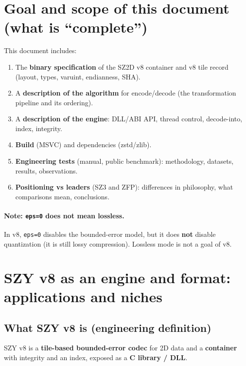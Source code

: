 \documentclass[11pt,a4paper]{article}
\begin{document}
\section{Goal and scope of this document (what is ``complete'')}
This document includes:
\begin{enumerate}
  \item The \textbf{binary specification} of the SZ2D v8 container and v8 tile record (layout, types, varuint, endianness, SHA).
  \item A \textbf{description of the algorithm} for encode/decode (the transformation pipeline and its ordering).
  \item A \textbf{description of the engine}: DLL/ABI API, thread control, decode-into, index, integrity.
  \item \textbf{Build} (MSVC) and dependencies (zstd/zlib).
  \item \textbf{Engineering tests} (manual, public benchmark): methodology, datasets, results, observations.
  \item \textbf{Positioning vs leaders} (SZ3 and ZFP): differences in philosophy, what comparisons mean, conclusions.
\end{enumerate}

\paragraph{Note: \texttt{eps=0} does not mean lossless.}
In v8, \texttt{eps=0} disables the bounded-error model, but it does \textbf{not} disable quantization (it is still lossy compression). Lossless mode is not a goal of v8.

\section{SZY v8 as an engine and format: applications and niches}

\subsection{What SZY v8 is (engineering definition)}
SZY v8 is a \textbf{tile-based bounded-error codec} for 2D data and a \textbf{container} with integrity and an index, exposed as a \textbf{C library / DLL}.
\end{document}
